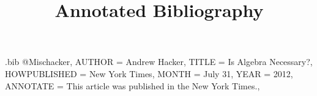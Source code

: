 \begin{filecontents*}{\jobname.bib}
@Misc{hacker,
    AUTHOR = {Andrew Hacker},
    TITLE = {Is Algebra Necessary?},
    HOWPUBLISHED = {New York Times},
    MONTH = {July 31},
    YEAR = {2012},
    ANNOTATE = {This article was published in the New York Times.},
}
\end{filecontents*}
\documentclass[12pt]{article}
\title{Annotated Bibliography}



\nocite{*}




